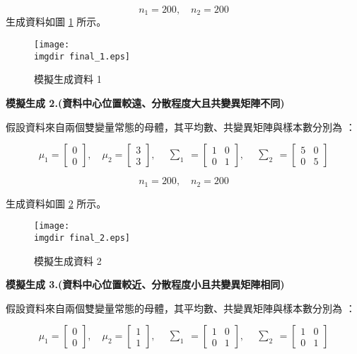 \[n_1 = 200, \quad n_2 = 200\]
\newpage
生成資料如圖 \ref{fig:final_1} 所示。
\begin{figure}[H]
    \centering
        \texttt{[image: \\imgdir final\_1.eps]}
    \caption{模擬生成資料 1}
    \label{fig:final_1}
\end{figure}

\textbf{\large 模擬生成 2.(資料中心位置較遠、分散程度大且共變異矩陣不同)}

假設資料來自兩個雙變量常態的母體，其平均數、共變異矩陣與樣本數分別為 ：

\[\mu_1 = \begin{bmatrix}
0 \\
0
\end{bmatrix}, \quad \mu_2 = \begin{bmatrix}
3 \\
3
\end{bmatrix}, \quad \begin{matrix} \sum_{1} \end{matrix} = \begin{bmatrix}
1 & 0\\
0 & 1
\end{bmatrix}, \quad \begin{matrix} \sum_{2} \end{matrix} = \begin{bmatrix}
5 & 0\\
0 & 5
\end{bmatrix}\]

\[n_1 = 200, \quad n_2 = 200\]

生成資料如圖 \ref{fig:final_2} 所示。
\begin{figure}[H]
    \centering
        \texttt{[image: \\imgdir final\_2.eps]}
    \caption{模擬生成資料 2}
    \label{fig:final_2}
\end{figure}

\textbf{\large 模擬生成 3.(資料中心位置較近、分散程度小且共變異矩陣相同)}

假設資料來自兩個雙變量常態的母體，其平均數、共變異矩陣與樣本數分別為 ：

\[\mu_1 = \begin{bmatrix}
0 \\
0
\end{bmatrix}, \quad \mu_2 = \begin{bmatrix}
1 \\
1
\end{bmatrix}, \quad \begin{matrix} \sum_{1} \end{matrix} = \begin{bmatrix}
1 & 0\\
0 & 1
\end{bmatrix}, \quad \begin{matrix} \sum_{2} \end{matrix} = \begin{bmatrix}
1 & 0\\
0 & 1
\end{bmatrix}\]

